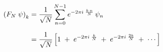 \documentclass[preview]{standalone}
\begin{document}
\begin{align*}
\begin{aligned}\left( F_N\; \psi \right)_k &= \frac{1}{\sqrt{N}} \sum_{n=0}^{N-1} e^{-2\pi i\; \frac{k\,n}{N}}\,\psi_n \\[6pt]&= \frac{1}{\sqrt{N}} \, \Bigl[ 1 \;+\; e^{-2\pi i\; \frac{k}{N}} \;+\; e^{-2\pi i\; \frac{2k}{N}} \;+\; \cdots \Bigr]\end{aligned}
\end{align*}
\end{document}
